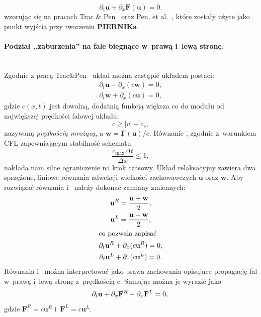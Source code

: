 \begin{equation}\label{diffeuler}
   \partial_t \mathbf{u} + \partial_{x} \mathbf{F}(\mathbf{u}) = 0.
\end{equation}
wzorując się na pracach Trac \& Pen~\cite*{2003PASP..115..303T}
oraz Pen, et al.~\cite*{2003ApJS..149..447P}, które zostały użyte jako punkt
wyjścia przy tworzeniu \textbf{PIERNIKa}. 

\paragraph{Podział ,,zaburzenia'' na fale biegnące w~prawą i~lewą stronę.} ~\\
%
Zgodnie z pracą Trac\&Pen~\cite{2003PASP..115..303T} układ 
można zastąpić układem postaci:
%
\begin{gather}
   \partial_t \mathbf{u} + \partial_x (c\mathbf{w}) = 0, \label{rel1}\\
   \partial_t \mathbf{w} + \partial_x (c\mathbf{u}) = 0, \label{rel2}
\end{gather}
%
gdzie $c(x,t)$ jest dowolną, dodatnią funkcją większa co do modułu od
największej prędkości falowej układu: 
%
\begin{equation}\label{fs}
   c \ge |v| + c_s,
\end{equation}
nazywaną \emph{prędkością mrożącą}, a $\mathbf{w} = \mathbf{F}(\mathbf{u})/c$. 
Równanie , zgodnie z~warunkiem CFL zapewniającym stabilność schematu
%
\begin{equation}\label{cfl}
   \frac{c_{\textrm{max}}\Delta t}{\Delta x} \le 1,
\end{equation}
%
nakłada nam silne ograniczenie na krok czasowy.  Układ relaksacyjny zawiera dwa
sprzężone, liniowe równania adwekcji wielkości zachowawczych $\mathbf{u}$ oraz
$\mathbf{w}$. Aby rozwiązać równania  i~ należy dokonać
zamiany zmiennych:
%
\begin{gather}
   \mathbf{u}^R = \frac{\mathbf{u} + \mathbf{w}}{2}, \\
   \mathbf{u}^L = \frac{\mathbf{u} - \mathbf{w}}{2}, \\
   \intertext{co pozwala zapisać}
   \partial_t \mathbf{u}^R + \partial_x (c\mathbf{u}^R) = 0,\label{rel3}\\
   \partial_t \mathbf{u}^L + \partial_x (c\mathbf{u}^L) = 0.\label{rel4}
\end{gather}
%
Równania  i~ można interpretować jako prawa zachowania
opisujące propagację fal w~pra\-wą i~lewą stronę z~prędkością $c$. Sumując można
je wyrazić jako
%
\begin{equation}
   \partial_t \mathbf{u} + \partial_x \mathbf{F}^R - \partial_x \mathbf{F}^L = 0,\\
\end{equation}
%
gdzie $\mathbf{F}^R=c \mathbf{u}^R$ i~$\mathbf{F}^L=c \mathbf{u}^L$. 
%
